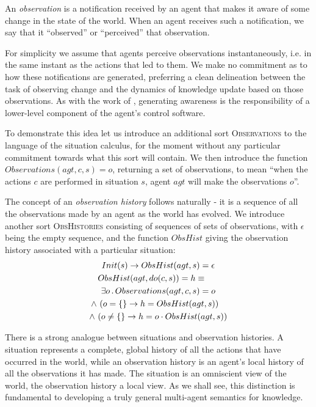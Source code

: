\documentclass{ifaamas-submission}
\newcommand{\noun}[1]{\textsc{#1}}
\begin{document}
\begin{definition}%
An \emph{observation} is a notification received by an agent that
makes it aware of some change in the state of the world. When an agent
receives such a notification, we say that it {}``observed'' or {}``perceived''
that observation.
\end{definition}%
For simplicity we assume that agents perceive observations instantaneously,
i.e. in the same instant as the actions that led to them. We make
no commitment as to how these notifications are generated, preferring
a clean delineation between the task of observing change and the dynamics
of knowledge update based on those observations. As with the work
of \cite{scherl03sc_knowledge}, generating awareness is the responsibility
of a lower-level component of the agent's control software.

To demonstrate this idea let us introduce an additional sort \noun{Observations}
to the language of the situation calculus, for the moment without
any particular commitment towards what this sort will contain. We
then introduce the function $Observations(agt,c,s)=o$, returning
a set of observations, to mean {}``when the actions $c$ are performed
in situation $s$, agent $agt$ will make the observations $o$''.

The concept of an \emph{observation history} follows naturally - it
is a sequence of all the observations made by an agent as the world
has evolved. We introduce another sort \noun{ObsHistories} consisting
of sequences of sets of observations, with $\epsilon$ being the empty
sequence, and the function $ObsHist$ giving the observation history
associated with a particular situation:\begin{multline}
Init(s)\rightarrow ObsHist(agt,s)=\epsilon\\
\shoveleft{ObsHist(agt,do(c,s))=h\equiv}\\
\exists o\,.\, Observations(agt,c,s)=o\\
\shoveright{\wedge\,\left(o=\{\}\rightarrow h=ObsHist(agt,s)\right)}\\
\wedge\,\left(o\neq\{\}\rightarrow h=o\cdot ObsHist(agt,s)\right)\label{eqn:obshist_defn}\end{multline}


There is a strong analogue between situations and observation histories.
A situation represents a complete, global history of all the actions
that have occurred in the world, while an observation history is an
agent's local history of all the observations it has made. The situation
is an omniscient view of the world, the observation history a local
view. As we shall see, this distinction is fundamental to developing
a truly general multi-agent semantics for knowledge.
\end{document}
